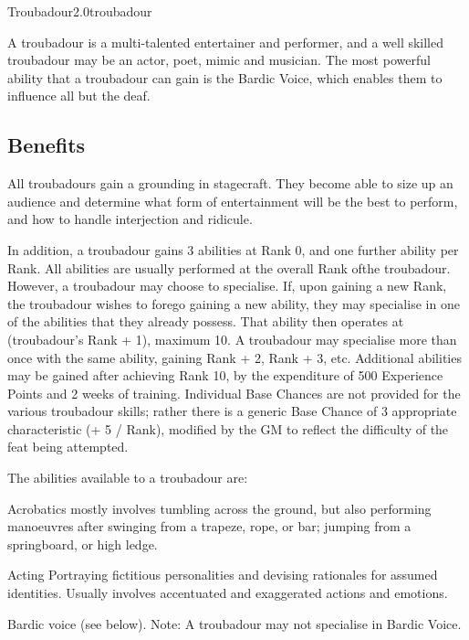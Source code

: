 \begin{skill}{Troubadour}{2.0}{troubadour}

A troubadour is a multi-talented entertainer and performer, and a well
skilled troubadour may be an actor, poet, mimic and musician. The most
powerful ability that a troubadour can gain is the Bardic Voice, which
enables them to influence all but the deaf.

\subsection{Benefits}

All troubadours gain a grounding in stagecraft. They become able to
size up an audience and determine what form of entertainment will be
the best to perform, and how to handle interjection and ridicule.

In addition, a troubadour gains 3 abilities at Rank 0, and one further
ability per Rank. All abilities are usually performed at the overall
Rank ofthe troubadour. However, a troubadour may choose to specialise.
If, upon gaining a new Rank, the troubadour wishes to forego gaining a
new ability, they may specialise in one of the abilities that they
already possess. That ability then operates at (troubadour's Rank +
1), maximum 10. A troubadour may specialise more than once with the
same ability, gaining Rank + 2, Rank + 3, etc. Additional abilities
may be gained after achieving Rank 10, by the expenditure of 500
Experience Points and 2 weeks of training. Individual Base Chances are
not provided for the various troubadour skills; rather there is a
generic Base Chance of 3 \x appropriate characteristic (+ 5 / Rank),
modified by the GM to reflect the difficulty of the feat being
attempted.

The abilities available to a troubadour are:

\begin{Description}

\item[Acrobatics]
mostly involves tumbling across the ground, but also performing
manoeuvres after swinging from a trapeze, rope, or bar; jumping from a
springboard, or high ledge.

\item[Acting]
Portraying fictitious personalities and devising rationales for
assumed identities.  Usually involves accentuated and exaggerated
actions and emotions.

\item[Bardic voice]
(see below). Note: A troubadour may not specialise in Bardic Voice.


\end{Description}
\end{skill}
